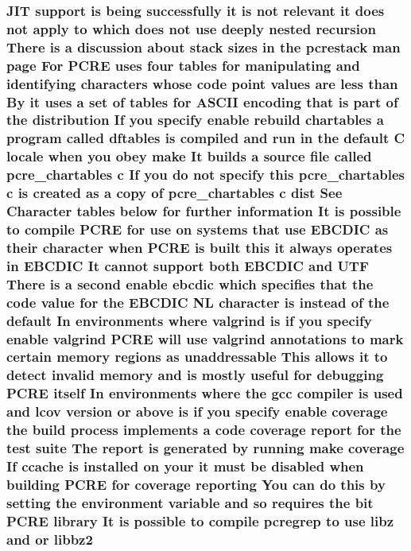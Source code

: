 \subsubsection[{\texorpdfstring{libbz2}{libbz2}}]{ J\+IT {\bf support} {\bf is} being successfully {\bf it} {\bf is} {\bf not} relevant {\bf it} does {\bf not} apply {\bf to} {\bf which} does {\bf not} use deeply nested {\bf recursion} There {\bf is} {\bf a} discussion about {\bf stack} sizes {\bf in} the pcrestack {\bf man} page For {\bf P\+C\+RE} uses four {\bf tables} for manipulating and identifying {\bf characters} whose {\bf code} {\bf point} {\bf values} {\bf are} less {\bf than} By {\bf it} uses {\bf a} {\bf set} {\bf of} {\bf tables} for {\bf A\+S\+C\+II} {\bf encoding} that {\bf is} part {\bf of} the distribution If you specify enable rebuild {\bf chartables} {\bf a} {\bf program} called {\bf dftables} {\bf is} {\bf compiled} and {\bf run} {\bf in} the {\bf default} {\bf C} {\bf locale} when you obey {\bf make} It builds {\bf a} {\bf source} {\bf file} called pcre\+\_\+chartables {\bf c} If you {\bf do} {\bf not} specify {\bf this} pcre\+\_\+chartables {\bf c} {\bf is} created {\bf as} {\bf a} copy {\bf of} pcre\+\_\+chartables {\bf c} {\bf dist} See Character {\bf tables} {\bf below} for further information It {\bf is} {\bf possible} {\bf to} {\bf compile} {\bf P\+C\+RE} for use {\bf on} {\bf systems} that use E\+B\+C\+D\+IC {\bf as} their {\bf character} when {\bf P\+C\+RE} {\bf is} {\bf built} {\bf this} {\bf it} always operates {\bf in} E\+B\+C\+D\+IC It cannot {\bf support} both E\+B\+C\+D\+IC and U\+TF There {\bf is} {\bf a} {\bf second} enable ebcdic {\bf which} specifies that the {\bf code} {\bf value} for the E\+B\+C\+D\+IC {\bf NL} {\bf character} {\bf is} instead {\bf of} the {\bf default} In {\bf environments} {\bf where} valgrind {\bf is} {\bf if} you specify enable valgrind {\bf P\+C\+RE} will use valgrind annotations {\bf to} {\bf mark} certain {\bf memory} regions {\bf as} unaddressable This allows {\bf it} {\bf to} detect invalid {\bf memory} and {\bf is} mostly useful for debugging {\bf P\+C\+RE} {\bf itself} In {\bf environments} {\bf where} the {\bf gcc} {\bf compiler} {\bf is} {\bf used} and lcov version {\bf or} {\bf above} {\bf is} {\bf if} you specify enable coverage the build {\bf process} implements {\bf a} {\bf code} coverage report for the test suite The report {\bf is} {\bf generated} by running {\bf make} coverage If ccache {\bf is} {\bf installed} {\bf on} your {\bf it} must {\bf be} disabled when building {\bf P\+C\+RE} for coverage reporting You {\bf can} {\bf do} {\bf this} by {\bf setting} the {\bf environment} variable and {\bf so} requires the {\bf bit} {\bf P\+C\+RE} {\bf library} It {\bf is} {\bf possible} {\bf to} {\bf compile} pcregrep {\bf to} use libz and {\bf or} libbz2}\hypertarget{README_8txt_a923df3cb55c007c3a20a8dfa7922a293}{}\label{README_8txt_a923df3cb55c007c3a20a8dfa7922a293}
